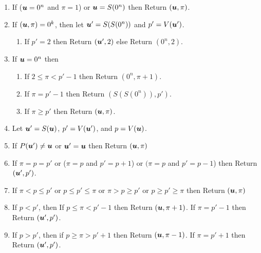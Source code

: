 \vspace{-0.2cm}

\begin{enumerate}
\item If ($\mbox{\boldmath $u$}=0^n$ and $\pi=1$) or $\mbox{\boldmath $u$}=S(0^n)$ then Return $(\mbox{\boldmath $u$},\pi)$. 
\item If $(\mbox{\boldmath $u$},\pi)=0^k$, then let $\mbox{\boldmath $u$}'=S(S(0^n))$ and $p'=V(\mbox{\boldmath $u$}')$. 
\begin{enumerate}
\item If $p'=2$ then Return $(\mbox{\boldmath $u$}',2)$ else Return $(0^n,2)$.
\end{enumerate}
\item If $\mbox{\boldmath $u$}=0^n$ then
\begin{enumerate}
\item If $2\le \pi<p'-1$ then Return $(0^n,\pi+1)$.
\item If $\pi=p'-1$ then Return $(S(S(0^n)),p')$.
\item If $\pi\ge p'$ then Return $(\mbox{\boldmath $u$},\pi)$.
\end{enumerate}
\item Let $\mbox{\boldmath $u$}'=S(\mbox{\boldmath $u$})$, $p'=V(\mbox{\boldmath $u$}')$, and $p=V(\mbox{\boldmath $u$})$. 
\item If $P(\mbox{\boldmath $u$}')\neq \mbox{\boldmath $u$}$ or $\mbox{\boldmath $u$}'=\mbox{\boldmath $u$}$ then Return $(\mbox{\boldmath $u$},\pi)$
\item If $\pi=p=p'$ or ($\pi=p$ and $p'=p+1$) or $(\pi=p$ and $p'=p-1$) then Return $(\mbox{\boldmath $u$}',p')$.
\item If $\pi<p\le p'$ or $p\le p'\le \pi$ or $\pi>p\ge p'$ or $p\ge p'\ge \pi$ then Return $(\mbox{\boldmath $u$},\pi)$
\item If $p<p'$, then If $p\le \pi<p'-1$ then Return $(\mbox{\boldmath $u$},\pi+1)$. If $\pi=p'-1$ then Return $(\mbox{\boldmath $u$}',p')$.
\item If $p>p'$, then if $p \ge \pi>p'+1$ then Return $(\mbox{\boldmath $u$},\pi-1)$. If $\pi=p'+1$ then Return $(\mbox{\boldmath $u$}',p')$.
\end{enumerate}
\medskip

\vspace{-0.2cm}

